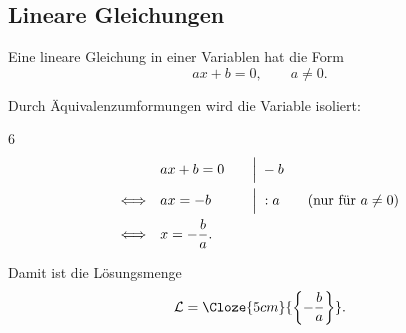 \subsection{Lineare Gleichungen}
\label{subsec:fundamentals_linear_equations}

Eine lineare Gleichung in einer Variablen hat die Form
\[
  ax+b=0, \qquad a\neq 0.
\]
\noindent\begin{minipage}{\linewidth}
  Durch Äquivalenzumformungen wird die Variable isoliert:
  \begin{ClozeArea}[27]{6}
    \[
      \begin{array}{r@{\quad}l@{\qquad}l}
        & ax+b=0 & \Big|\;-b \\[0.7em]
        \Longleftrightarrow & ax=-b
          & \Big|\;:a \qquad (\text{nur für }a\neq0) \\[0.7em]
        \Longleftrightarrow & x=-\dfrac{b}{a}. &
      \end{array}
    \]
  \end{ClozeArea}
\end{minipage}
Damit ist die Lösungsmenge
\[
  \mathcal{L}=\Cloze{5cm}{\left\{-\frac{b}{a}\right\}}.
\]
